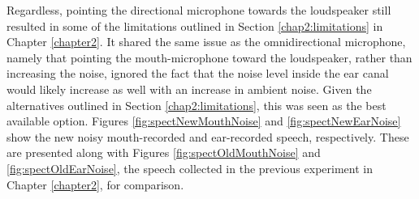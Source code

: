 Regardless, pointing the directional microphone towards the loudspeaker still resulted in some of the limitations outlined in Section \ref{chap2:limitations} in Chapter \ref{chapter2}.  
It shared the same issue as the omnidirectional microphone, namely that pointing the mouth-microphone toward the loudspeaker, rather than increasing the noise, ignored the fact that the noise level inside the ear canal would likely increase as well with an increase in ambient noise.  Given the alternatives outlined in Section \ref{chap2:limitations}, this was seen as the best available option.  Figures \ref{fig:spectNewMouthNoise} and \ref{fig:spectNewEarNoise} show the new noisy mouth-recorded and ear-recorded speech, respectively.  These are presented along with Figures \ref{fig:spectOldMouthNoise} and \ref{fig:spectOldEarNoise}, the speech collected in the previous experiment in Chapter \ref{chapter2}, for comparison.

